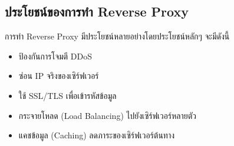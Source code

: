 \subsection{ประโยชน์ของการทำ Reverse Proxy}
การทำ Reverse Proxy มีประโยชน์หลายอย่างโดยประโยชน์หลักๆ จะมีดังนี้
\begin{itemize}
  \item ป้องกันการโจมตี DDoS
  \item ซ่อน IP จริงของเซิร์ฟเวอร์
  \item ใช้ SSL/TLS เพื่อเข้ารหัสข้อมูล
  \item กระจายโหลด (Load Balancing) ไปยังเซิร์ฟเวอร์หลายตัว
  \item แคชข้อมูล (Caching) ลดภาระของเซิร์ฟเวอร์ต้นทาง
\end{itemize}








